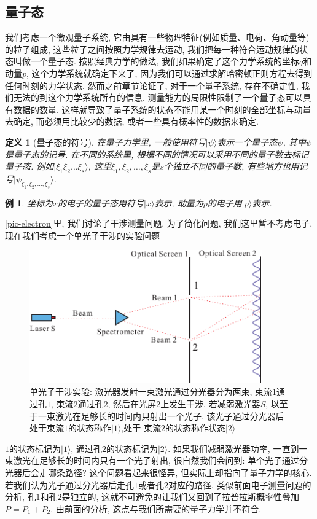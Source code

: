 \documentclass[a4paper,11pt]{book}
\newtheorem{definition}{\hspace{2em}定义}[section]
\newtheorem{example}{例}[section]
\begin{document}
\subsection{量子态}
我们考虑一个微观量子系统, 它由具有一些物理特征(例如质量、电荷、角动量等)的粒子组成, 这些粒子之间按照力学规律去运动, 我们把每一种符合运动规律的状态叫做一个量子态. 按照经典力学的做法, 我们如果确定了这个力学系统的坐标$q$和动量$p$, 这个力学系统就确定下来了, 因为我们可以通过求解哈密顿正则方程去得到任何时刻的力学状态. 然而之前章节论证了, 对于一个量子系统, 存在不确定性, 我们无法的到这个力学系统所有的信息. 测量能力的局限性限制了一个量子态可以具有数据的数量. 这样就导致了量子系统的状态不能用某一个时刻的全部坐标与动量去确定, 而必须用比较少的数据, 或者一些具有概率性的数据来确定.
\begin{definition}[量子态的符号]
  在量子力学里, 一般使用符号$|\psi\rangle$表示一个量子态$\psi$, 其中$\psi$是量子态的记号. 在不同的系统里, 根据不同的情况可以采用不同的量子数去标记量子态. 例如$|\xi_1\xi_2\dots \xi_s\rangle$, 这里$\xi_1,\xi_2,\dots,\xi_s$是$s$个独立不同的量子数, 有些地方也用记号$|\psi_{\xi_1,\xi_2,\dots,\xi_s}\rangle$.
\end{definition}
\begin{example}
  坐标为$x$的电子的量子态用符号$|x\rangle$表示, 动量为$p$的电子用$|p\rangle$表示.
\end{example}
\ref{pic-electron}里, 我们讨论了干涉测量问题. 为了简化问题, 我们这里暂不考虑电子, 现在我们考虑一个单光子干涉的实验问题
\begin{figure}[H]
  \centering
  \includegraphics[width=10cm]{fig8.pdf}
  \caption{单光子干涉实验: 激光器发射一束激光通过分光器分为两束, 束流$1$通过孔$1$, 束流$2$通过孔$2$, 然后在光屏$2$上发生干涉. 若减弱激光器$S$, 以至于一束激光在足够长的时间内只射出一个光子, 该光子通过分光器后处于束流$1$的状态称作$|1\rangle$,处于 束流$2$的状态称作状态$|2\rangle$}\label{Single photon interference}
\end{figure}
$1$的状态标记为$|1\rangle$, 通过孔$2$的状态标记为$|2\rangle$. 如果我们减弱激光器功率, 一直到一束激光在足够长的时间内只有一个光子射出, 很自然我们会问到: 单个光子通过分光器后会走哪条路径? 这个问题看起来很怪异, 但实际上却指向了量子力学的核心. 若我们认为光子通过分光器后走孔$1$或者孔$2$对应的路径, 类似前面电子测量问题的分析, 孔$1$和孔$2$是独立的, 这就不可避免的让我们又回到了拉普拉斯概率性叠加$P=P_1+P_2$. 由前面的分析, 这点与我们所需要的量子力学并不符合.
\end{document}
